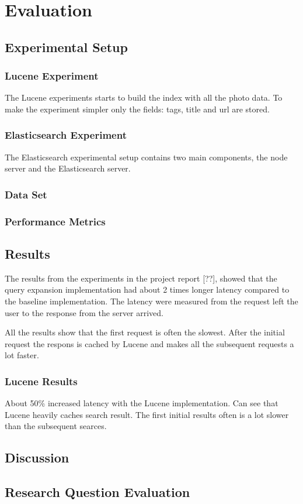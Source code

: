 \chapter{Evaluation}
\label{ch:evaluation}

\section{Experimental Setup}

\subsection{Lucene Experiment}
The Lucene experiments starts to build the index with all the photo data.
To make the experiment simpler only the fields: tags, title and url are stored.

\subsection{Elasticsearch Experiment}
The Elasticsearch experimental setup contains two main components, the node server and the Elasticsearch server.

\subsection{Data Set}
\label{sec:dataset}

\subsection{Performance Metrics}

\section{Results}
\label{sec:results}
The results from the experiments in the project report [??],
showed that the query expansion implementation had about 2 times longer latency compared to the baseline implementation.
The latency were measured from the request left the user to the response from the server arrived.

All the results show that the first request is often the slowest.
After the initial request the respons is cached by Lucene and makes all the subsequent requests a lot faster.

\subsection{Lucene Results}
About 50\% increased latency with the Lucene implementation.
Can see that Lucene heavily caches search result.
The first initial results often is a lot slower than the subsequent searces.

\section{Discussion}

\section{Research Question Evaluation}
